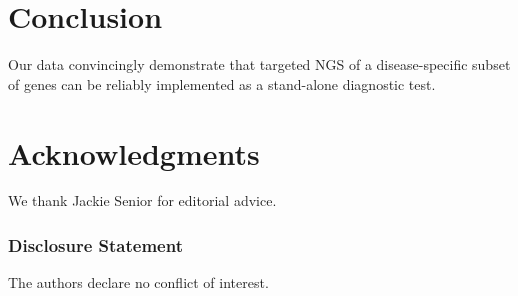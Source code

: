 \section{Conclusion}
Our data convincingly demonstrate that targeted NGS of a disease-specific subset of genes can be reliably implemented as a stand-alone diagnostic test.

\section{Acknowledgments}\label{Acknowledgments} 
We thank Jackie Senior for editorial advice.


\subsubsection{Disclosure Statement} 
The authors declare no conflict of interest.

